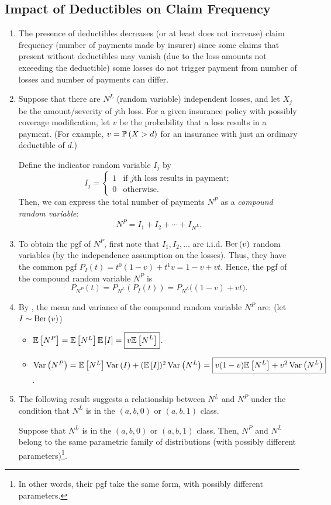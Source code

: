 \subsection{Impact of Deductibles on Claim Frequency}
\begin{enumerate}
\item The presence of deductibles decreases (or at least does not increase)
claim frequency (number of payments made by insurer) since some claims that
present without deductibles may vanish (due to the loss amounts not exceeding
the deductible)  some losses do not trigger payment from
  number of losses and number of payments
can differ.

\item \label{it:nlnp-setting}
Suppose that there are \(N^L\) (random variable) independent losses, and
let \(X_j\) be the amount/severity of \(j\)th loss. For a given insurance
policy with possibly coverage modification, let \(v\) be the probability that a
loss results in a payment. (For example, \(v=\mathbb{P}\left(X>d\right)\) for an insurance with
just an ordinary deductible of \(d\).)

Define the indicator random variable \(I_j\) by
\[
I_j=\begin{cases}
1&\text{if \(j\)th loss results in payment};\\
0&\text{otherwise}.
\end{cases}
\]
Then, we can express the total number of payments \(N^P\) as a \emph{compound
random variable}:
\[
N^P=I_1+I_2+\dotsb+I_{N^L}.
\]

\item \label{it:ded-payment-num-pgf}
To obtain the pgf of \(N^P\), first note that \(I_1,I_2,\dotsc\) are i.i.d.
\(\operatorname{Ber}\left(v\right)\) random variables (by the independence assumption on the losses).
Thus, they have the common pgf \(P_I(t)=t^0(1-v)+t^1v=1-v+vt\). Hence, the pgf
of the compound random variable \(N^P\) is
\[
P_{N^P}(t)=P_{N^L}(P_I(t))=\boxed{P_{N^L}\big((1-v)+vt\big)}.
\]

\item \label{it:np-mean-var}
By , the mean and variance of the compound
random variable \(N^P\) are: (let \(I\sim\operatorname{Ber}\left(v\right)\))
\begin{itemize}
\item \(\mathbb{E}\left[N^P\right]=\mathbb{E}\left[N^L\right]\mathbb{E}\left[I\right]=\boxed{v\mathbb{E}\left[N^L\right]}\).
\item \(\operatorname{Var}\left(N^P\right)=\mathbb{E}\left[N^L\right]\operatorname{Var}\left(I\right)+(\mathbb{E}\left[I\right])^2\operatorname{Var}\left(N^L\right)=\boxed{v(1-v)\mathbb{E}\left[N^L\right]+v^2\operatorname{Var}\left(N^L\right)}\).
\end{itemize}

\item The following result suggests a relationship between \(N^L\) and \(N^P\)
under the condition that \(N^L\) is in the \((a,b,0)\) or \((a,b,1)\) class.
\begin{theorem}
\label{thm:ab01-nl-np-same-family}
Suppose that \(N^L\) is in the \((a,b,0)\) or \((a,b,1)\) class. Then, \(N^P\)
and \(N^L\) belong to the same parametric family of distributions (with
possibly different parameters)\footnote{In other words, their pgf take the same
form, with possibly different parameters.}.
\end{theorem}
\end{enumerate}
